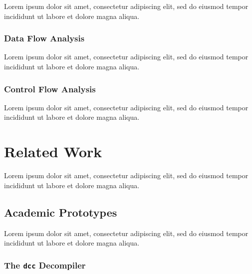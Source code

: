 \documentclass[12pt, a4paper]{article}
\begin{document}
Lorem ipsum dolor sit amet, consectetur adipiscing elit, sed do eiusmod tempor incididunt ut labore et dolore magna aliqua.


\subsubsection{Data Flow Analysis}

Lorem ipsum dolor sit amet, consectetur adipiscing elit, sed do eiusmod tempor incididunt ut labore et dolore magna aliqua.

\cite{type_decomp}


\subsubsection{Control Flow Analysis}

Lorem ipsum dolor sit amet, consectetur adipiscing elit, sed do eiusmod tempor incididunt ut labore et dolore magna aliqua.


\section{Related Work}

Lorem ipsum dolor sit amet, consectetur adipiscing elit, sed do eiusmod tempor incididunt ut labore et dolore magna aliqua.


\subsection{Academic Prototypes}

Lorem ipsum dolor sit amet, consectetur adipiscing elit, sed do eiusmod tempor incididunt ut labore et dolore magna aliqua.


\subsubsection{The \texttt{dcc} Decompiler}
\end{document}
